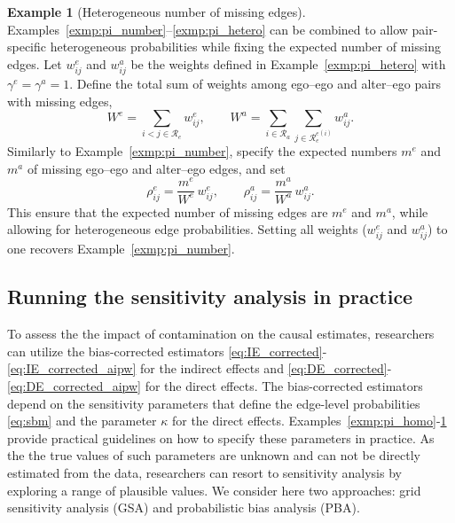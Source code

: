 \documentclass[11pt]{article}
\theoremstyle{definition}
\newtheorem{exmp}{Example}
\def \cR {\mathcal{R}}
\begin{document}
\begin{exmp}[Heterogeneous number of missing edges]
\label{exmp:pi_hetero_number}
    Examples~\ref{exmp:pi_number}–\ref{exmp:pi_hetero} can be combined to allow 
    pair-specific heterogeneous probabilities while fixing the expected number of missing edges.
    Let $w_{ij}^e$ and $w_{ij}^a$ be the weights defined in Example~\ref{exmp:pi_hetero} with $\gamma^e=\gamma^a=1$.
    Define the total sum of weights among ego--ego and alter--ego pairs with missing edges,
    \begin{equation*}
     W^e=\sum_{i<j\in \cR_e}w_{ij}^e, \qquad W^a = \sum_{i\in \cR_a}\sum_{j \in \cR_e^{e(i)}} w_{ij}^a.   
    \end{equation*}
    Similarly to Example~\ref{exmp:pi_number}, specify the expected numbers $m^e$ and $m^a$
        of missing ego--ego and alter--ego edges, and set
    \begin{equation*}
        \rho^e_{ij}=\frac{m^e}{W^e}\,w^e_{ij},
        \qquad
        \rho^a_{ij}=\frac{m^a}{W^a}\,w^a_{ij}.
    \end{equation*}
    This ensure that the expected number of missing edges are $m^e$ and $m^a$,
     while allowing for heterogeneous edge probabilities.
    Setting all weights ($w_{ij}^e$ and $w_{ij}^a$) to one recovers Example~\ref{exmp:pi_number}.
\end{exmp}

\subsection{Running the sensitivity analysis in practice}
\label{subsec:practice}
To assess the the impact of contamination on the causal estimates, 
researchers can utilize the bias-corrected estimators
\eqref{eq:IE_corrected}-\eqref{eq:IE_corrected_aipw} for the indirect effects
and \eqref{eq:DE_corrected}-\eqref{eq:DE_corrected_aipw} for the direct effects.
The bias-corrected estimators depend on the sensitivity parameters
that define the edge-level probabilities \eqref{eq:sbm} and the parameter $\kappa$ for the direct effects.
Examples~\ref{exmp:pi_homo}-\ref{exmp:pi_hetero_number} provide practical guidelines on how
 to specify these parameters in practice.
As the the true values of such parameters are unknown and can not be directly estimated from the data,
 researchers can resort to sensitivity analysis by exploring a range of plausible values.
 We consider here two approaches: grid sensitivity analysis (GSA) and probabilistic bias analysis (PBA).
 
\end{document}
